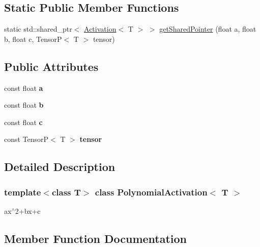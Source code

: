 \subsection*{Static Public Member Functions}
\begin{DoxyCompactItemize}
\item 
static std\+::shared\+\_\+ptr$<$ \hyperlink{classActivation}{Activation}$<$ T $>$ $>$ \hyperlink{classPolynomialActivation_a48b1d88e1c62d65bfb8148625aa6b245}{get\+Shared\+Pointer} (float a, float b, float c, TensorP$<$ T $>$ tensor)
\end{DoxyCompactItemize}
\subsection*{Public Attributes}
\begin{DoxyCompactItemize}
\item 
\mbox{\label{classPolynomialActivation_a0340f6d2e54ed0c417618f8487300421}} 
const float {\bfseries a}
\item 
\mbox{\label{classPolynomialActivation_adececd0c6b3bb702aa8666f1aa46cac1}} 
const float {\bfseries b}
\item 
\mbox{\label{classPolynomialActivation_a58174c4eed6ba216758701c3105f7e92}} 
const float {\bfseries c}
\item 
\mbox{\label{classPolynomialActivation_a23ec90b1a33c058c093a3dd944d08ae0}} 
const TensorP$<$ T $>$ {\bfseries tensor}
\end{DoxyCompactItemize}


\subsection{Detailed Description}
\subsubsection*{template$<$class T$>$\newline
class Polynomial\+Activation$<$ T $>$}

ax$^\wedge$2+bx+c 

\subsection{Member Function Documentation}
\mbox{\label{classPolynomialActivation_ac245cf706f30922e33700ca58de7c21d}} 
